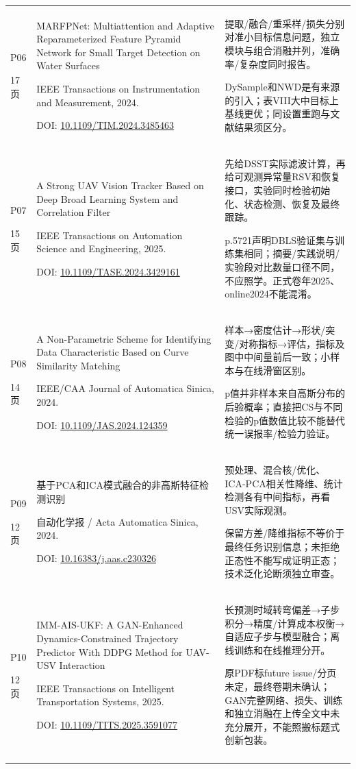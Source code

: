 \begin{longtable}{@{}>{\raggedright\arraybackslash}p{1cm}>{\raggedright\arraybackslash}p{7.0cm}>{\raggedright\arraybackslash}p{7.4cm}@{}}
P06\par 17页 & MARFPNet: Multiattention and Adaptive Reparameterized Feature Pyramid Network for Small Target Detection on Water Surfaces\par IEEE Transactions on Instrumentation and Measurement, 2024. \par DOI: \url{10.1109/TIM.2024.3485463} & 提取/融合/重采样/损失分别对准小目标信息问题，独立模块与组合消融并列，准确率/复杂度同时报告。\par DySample和NWD是有来源的引入；表VIII大中目标上基线更优；同设置重跑与文献结果须区分。 \\\addlinespace[5pt]
P07\par 15页 & A Strong UAV Vision Tracker Based on Deep Broad Learning System and Correlation Filter\par IEEE Transactions on Automation Science and Engineering, 2025. \par DOI: \url{10.1109/TASE.2024.3429161} & 先给DSST实际滤波计算，再给可观测异常量RSV和恢复接口，实验同时检验初始化、状态检测、恢复及最终跟踪。\par p.5721声明DBLS验证集与训练集相同；摘要/实践说明/实验段对比数量口径不同，不应照学。正式卷年2025、online2024不能混淆。 \\\addlinespace[5pt]
P08\par 14页 & A Non-Parametric Scheme for Identifying Data Characteristic Based on Curve Similarity Matching\par IEEE/CAA Journal of Automatica Sinica, 2024. \par DOI: \url{10.1109/JAS.2024.124359} & 样本→密度估计→形状/突变/对称指标→评估，指标及图中中间量前后一致；小样本与在线滑窗区别。\par p值并非样本来自高斯分布的后验概率；直接把CS与不同检验的p值数值比较不能替代统一误报率/检验力验证。 \\\addlinespace[5pt]
P09\par 12页 & 基于PCA和ICA模式融合的非高斯特征检测识别\par 自动化学报 / Acta Automatica Sinica, 2024. \par DOI: \url{10.16383/j.aas.c230326} & 预处理、混合核/优化、ICA-PCA相关性降维、统计检测各有中间指标，再看USV实际观测。\par 保留方差/降维指标不等价于最终任务识别信息；未拒绝正态性不能写成证明正态；技术泛化论断须独立审查。 \\\addlinespace[5pt]
P10\par 12页 & IMM-AIS-UKF: A GAN-Enhanced Dynamics-Constrained Trajectory Predictor With DDPG Method for UAV-USV Interaction\par IEEE Transactions on Intelligent Transportation Systems, 2025. \par DOI: \url{10.1109/TITS.2025.3591077} & 长预测时域转弯偏差→子步积分→精度/计算成本权衡→自适应子步与模型融合；离线训练和在线推理分开。\par 原PDF标future issue/分页未定，最终卷期未确认；GAN完整网络、损失、训练和独立消融在上传全文中未充分展开，不能照搬标题式创新包装。 \\\addlinespace[5pt]
\end{longtable}
\endgroup

